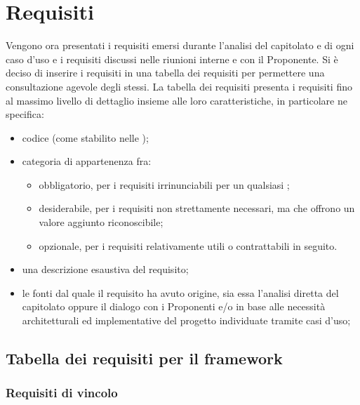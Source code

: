 \section{Requisiti}
Vengono ora presentati i requisiti emersi durante l'analisi del capitolato e di ogni caso d'uso e i requisiti discussi nelle riunioni interne e con il Proponente.
Si è deciso di inserire i requisiti in una tabella dei requisiti per permettere una consultazione agevole degli stessi.
La tabella dei requisiti presenta i requisiti fino al massimo livello di dettaglio insieme alle loro caratteristiche, in particolare ne specifica:
\begin{itemize}
	\item codice (come stabilito nelle \NormeDiProgetto{});
	\item categoria di appartenenza fra:
	\begin{itemize}
		\item obbligatorio, per i requisiti irrinunciabili per un qualsiasi ;
		\item desiderabile, per i requisiti non strettamente necessari, ma che offrono un valore aggiunto riconoscibile;
		\item opzionale, per i requisiti relativamente utili o contrattabili in seguito.
	\end{itemize}
	\item una descrizione esaustiva del requisito;
	\item le fonti dal quale il requisito ha avuto origine, sia essa l'analisi diretta del capitolato oppure il dialogo con i Proponenti e/o in base alle necessità architetturali ed implementative del progetto individuate tramite casi d'uso;	
\end{itemize}

\subsection{Tabella dei requisiti per il framework \ProjectName}

\subsubsection{Requisiti di vincolo}


